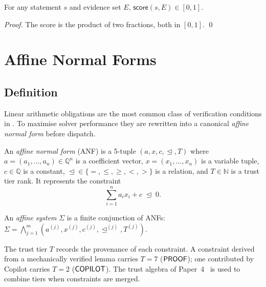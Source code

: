 \documentclass[11pt]{article}
\newcommand{\AffSys}{\Sigma}                 %
\newcommand{\Score}{\mathsf{score}}          %
\begin{document}
\begin{proposition}\label{prop:score-bounds}
For any statement $s$ and evidence set $E$,
$\Score(s, E) \in [0, 1]$.
\end{proposition}
\begin{proof}
The score is the product of two fractions, both in $[0,1]$.
\qed
\end{proof}

\section{Affine Normal Forms}\label{sec:affine}

\subsection{Definition}

Linear arithmetic obligations are the most common class of
verification conditions in \JuGeo{}.
To maximise solver performance they are rewritten into a
canonical \emph{affine normal form} before dispatch.

\begin{definition}\label{def:anf}
An \emph{affine normal form} (ANF) is a 5-tuple
$(a, x, c, \trianglelefteq, T)$ where
$a = (a_1, \ldots, a_n) \in \mathbb{Q}^n$
is a coefficient vector,
$x = (x_1, \ldots, x_n)$ is a variable tuple,
$c \in \mathbb{Q}$ is a constant,
$\trianglelefteq \in \{=, \leq, \geq, <, >\}$
is a relation, and
$T \in \mathbb{N}$ is a trust tier rank.
It represents the constraint
\[
  \sum_{i=1}^{n} a_i x_i + c \;\trianglelefteq\; 0.
\]
\end{definition}

\begin{definition}\label{def:affine-system}
An \emph{affine system} $\AffSys$ is a finite conjunction of ANFs:
$\AffSys = \bigwedge_{j=1}^{m} (a^{(j)}, x^{(j)}, c^{(j)},
\trianglelefteq^{(j)}, T^{(j)})$.
\end{definition}

\begin{remark}
The trust tier $T$ records the provenance of each constraint.
A constraint derived from a mechanically verified lemma carries
$T = 7$ ($\mathsf{PROOF}{}$); one contributed by Copilot carries
$T = 2$ ($\mathsf{COPILOT}{}$).
The trust algebra of Paper~4~\cite{paper04} is used to combine
tiers when constraints are merged.
\end{remark}
\end{document}
